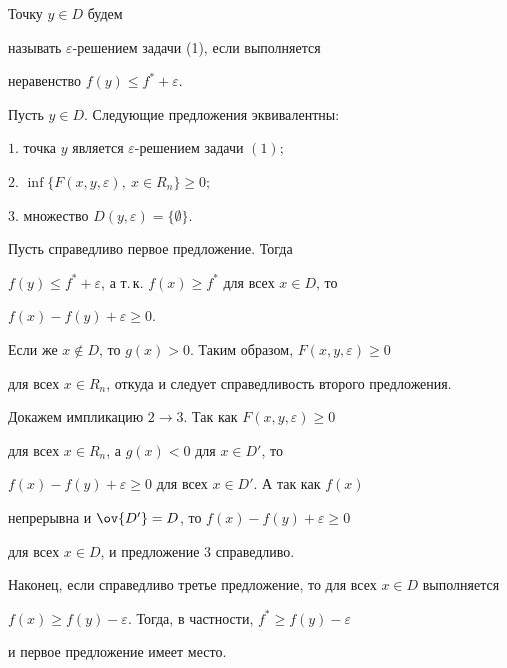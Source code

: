 \begin{defn}


Точку $y\in D$ будем


называть $\varepsilon$-решением задачи (1), если выполняется


неравенство $f(y)\le f^*+\varepsilon$.


\end{defn}





\begin{lem}


Пусть $y\in D$. Следующие предложения эквивалентны$:$





$1.$ точка $y$ является $\varepsilon$-решением задачи $(1);$





$2.$ $\inf\{F(x,y,\varepsilon),\ x\in R_n\}\ge0;$





$3.$ множество $D(y,\varepsilon)=\{\emptyset\}$.


\end{lem}





\begin{pf}


Пусть справедливо первое предложение. Тогда


$f(y)\le f^*+\varepsilon$, а т.\,к. $f(x)\ge f^*$ для всех $x\in D$, то


$f(x)-f(y)+\varepsilon\ge0$.


Если же $x\notin D$, то $g(x)>0$. Таким образом, $F(x,y,\varepsilon)\ge0$


для всех $x\in R_n$, откуда и следует справедливость второго предложения.





Докажем импликацию $2\rightarrow3$. Так как $F(x,y,\varepsilon)\ge0$


для всех $x\in R_n$, а $g(x)<0$ для $x\in D'$, то


$f(x)-f(y)+\varepsilon\ge0$ для всех $x\in D'$. А так как $f(x)$


непрерывна и $\ov{D'}=D$, то $f(x)-f(y)+\varepsilon\ge0$


для всех $x\in D$, и предложение 3 справедливо. 





Наконец, если справедливо третье предложение, то для всех $x\in D$ выполняется


$f(x)\ge f(y)-\varepsilon$. Тогда, в частности, $f^*\ge f(y)-\varepsilon$


и первое предложение имеет место.


\end{pf}





